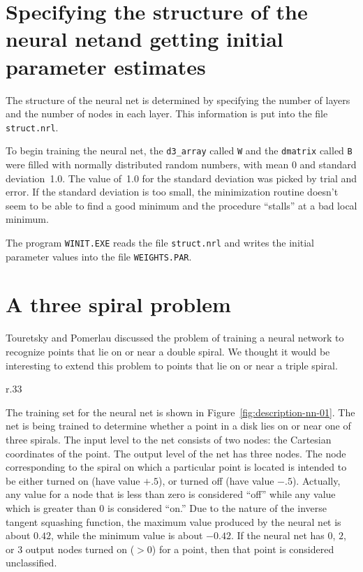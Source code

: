 \documentclass{admbmanual}
\begin{document}
\section{Specifying the structure of the neural net\br and getting initial parameter estimates}

The structure of the neural net is determined by specifying the number of
layers and the number of nodes in each layer. This information
is put into the file \texttt{struct.nrl}.

To begin training the neural net, the \texttt{d3\_array} called \texttt{W} and the
\texttt{dmatrix} called \texttt{B} were filled with normally distributed random numbers,
with mean 0 and standard deviation~1.0.  The value of~1.0 for the standard
deviation was picked by trial and error. If the standard deviation is
too small, the minimization routine doesn't seem to be able to find 
a good minimum and the procedure ``stalls'' at a bad local minimum.

The program \texttt{WINIT.EXE} reads the file \texttt{struct.nrl} and
writes the initial parameter values into the file \texttt{WEIGHTS.PAR}.  
 

\section{A three spiral problem}

Touretsky and Pomerlau \cite{touretzkypomerlau1989} discussed the problem of training
a neural network to recognize points that lie on or  near
a double spiral. We thought it would be interesting to
extend this problem to points that lie on or near 
a triple spiral.

\begin{wrapfigure}{r}{.33\textwidth}%
      \centering
        { \par}%
      \emptycaption{}%
      \label{fig:description-nn-01}
\end{wrapfigure}

The training set for the neural net is shown in Figure~\ref{fig:description-nn-01}. %
The net is being trained to determine whether a point in a disk 
lies on or near one of three spirals. 
The input level to the net consists of two nodes: the 
Cartesian coordinates of the point. The output level of the net has 
three nodes. The node corresponding to the spiral on which
a particular point is located
is intended to be either turned on (have value $+.5$),
 or turned off (have value $-.5$). Actually,
any value for a node that is less than zero is considered
``off'' while any value which is greater than $0$ is considered
``on.'' Due to the nature of the inverse tangent squashing function,
the maximum value produced by the neural net is about $0.42$, while the
minimum value is about $-0.42$. If the neural net has $0$, $2$, or $3$ output
nodes turned on ($>0$) for a point, then that point is considered unclassified.
\end{document}
